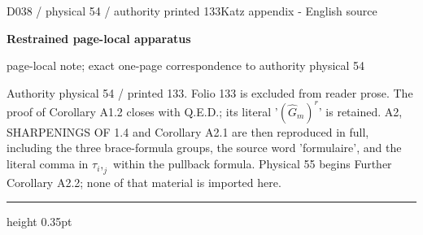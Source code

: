 \documentclass[9pt]{article}
\newcommand{\CanonText}[1]{\par{\fontsize{8.0}{9.35}\selectfont\RaggedRight #1\par}\vspace{2.2pt}}
\newcommand{\LayerTitle}{Restrained page-local apparatus}
\begin{document}
\noindent\begin{minipage}[t][\dimexpr\textheight-5pt\relax][t]{\textwidth}
{\sffamily\fontsize{7.3}{8.2}\selectfont\color{Quiet} D038 / physical 54 / authority printed 133\hfill Katz appendix - English source}
\par{}\vspace{4.5pt}
{\sffamily\fontsize{10.4}{11.6}\selectfont\bfseries\color{Accent} \LayerTitle}
\par{\sffamily\fontsize{6.7}{7.7}\selectfont\color{Quiet} page-local note; exact one-page correspondence to authority physical 54}
\vspace{5pt}
\CanonText{Authority physical 54 / printed 133. Folio 133 is excluded from reader prose. The proof of Corollary A1.2 closes with Q.E.D.; its literal '\((\widehat{G}_{m})^{r}\)' is retained. A2, SHARPENINGS OF 1.4 and Corollary A2.1 are then reproduced in full, including the three brace-formula groups, the source word 'formulaire', and the literal comma in \(\tau{}_{i},_{j}\) within the pullback formula. Physical 55 begins Further Corollary A2.2; none of that material is imported here.}
\vfill
{\color{Accent}\hrule height 0.35pt}\vspace{3pt}
\end{minipage}
\newpage
\end{document}
